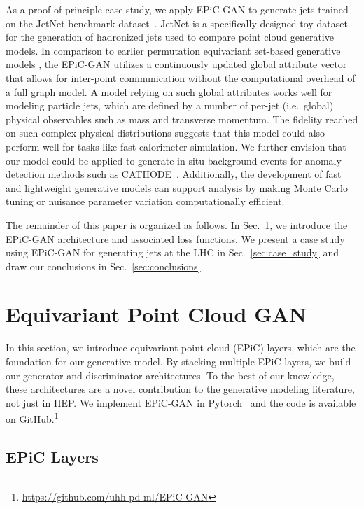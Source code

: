 \documentclass[a4paper,submission, Phys]{SciPost}
\DeclareRobustCommand{\Sec}[1]{Sec.~\ref{sec:#1}}
\begin{document}
As a proof-of-principle case study, we apply EPiC-GAN to generate jets trained on the JetNet benchmark dataset~\cite{MPGAN}.
%
JetNet is a specifically designed toy dataset for the generation of hadronized jets used to compare point cloud generative models. 
%
In comparison to earlier permutation equivariant set-based generative models \cite{PCGAN_2018, PointFlow_1906.12320, PointDiffusion_2103.01458}, the EPiC-GAN utilizes a continuously updated global attribute vector that allows for inter-point communication without the computational overhead of a full graph model.
%
A model relying on such global attributes works well for modeling particle jets, which are defined by a number of per-jet (i.e.~global) physical observables such as mass and transverse momentum.  
%
The fidelity reached on such complex physical distributions suggests that this model could also perform well for tasks like fast calorimeter simulation.
% 
We further envision that our model could be applied to generate in-situ background events for anomaly detection methods such as CATHODE~\cite{Hallin_2022_CATHODE}.
%
Additionally, the development of fast and lightweight generative models can support analysis by making Monte Carlo tuning or nuisance parameter variation computationally efficient.


The remainder of this paper is organized as follows.
%
In \Sec{EPiC-GAN}, we introduce the EPiC-GAN architecture and associated loss functions.
%
We present a case study using EPiC-GAN for generating jets at the LHC in \Sec{case_study} and draw our conclusions in \Sec{conclusions}. 




\section{Equivariant Point Cloud GAN}
\label{sec:EPiC-GAN}

In this section, we introduce equivariant point cloud (EPiC) layers, which are the foundation for our generative model.
%
By stacking multiple EPiC layers, we build our generator and discriminator architectures.
%
To the best of our knowledge, these architectures are a novel contribution to the generative modeling literature, not just in HEP.
%
We implement EPiC-GAN in Pytorch~\cite{Pytorch} and the code is available on GitHub.\footnote{\url{https://github.com/uhh-pd-ml/EPiC-GAN}}


\subsection{EPiC Layers}
\label{sec:epic-layer}
\end{document}
